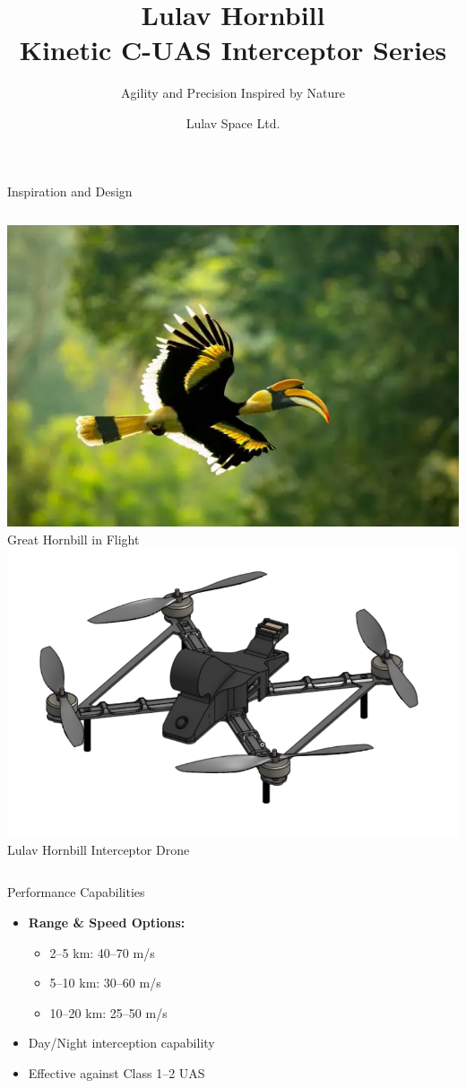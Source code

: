 \documentclass{beamer}
\title[Lulav Hornbill]{\textbf{Lulav Hornbill}\\Kinetic C-UAS Interceptor Series}
\subtitle{Agility and Precision Inspired by Nature}
\author{Lulav Space Ltd.}
\date{}
\begin{document}
\begin{frame}
    \titlepage
\end{frame}

\begin{frame}{Inspiration and Design}
\begin{columns}
        \includegraphics[width=\linewidth]{hornbill_image.png}
        \centering\scriptsize Great Hornbill in Flight
        \includegraphics[width=\linewidth]{lulav_hornbill.png}
        \centering\scriptsize Lulav Hornbill Interceptor Drone
\end{columns}
\end{frame}

\begin{frame}{Performance Capabilities}
\begin{itemize}
    \item \textbf{Range \& Speed Options:}
    \begin{itemize}
        \item 2–5 km: 40–70 m/s
        \item 5–10 km: 30–60 m/s
        \item 10–20 km: 25–50 m/s
    \end{itemize}
    \item Day/Night interception capability
    \item Effective against Class 1–2 UAS
\end{itemize}
\end{frame}
\end{document}
